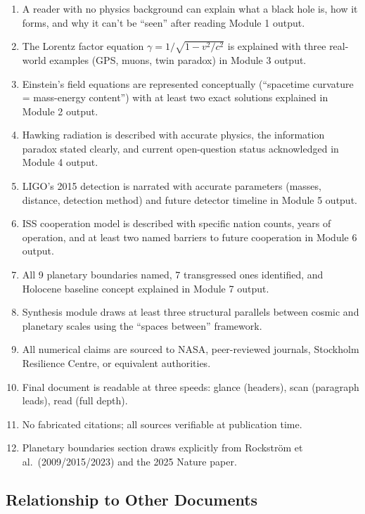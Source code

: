 \documentclass[11pt,letterpaper]{article}
\begin{document}
\begin{enumerate}[leftmargin=*]
\item A reader with no physics background can explain what a black hole is, how it forms, and why it can't be ``seen'' after reading Module 1 output.
\item The Lorentz factor equation $\gamma = 1/\sqrt{1-v^2/c^2}$ is explained with three real-world examples (GPS, muons, twin paradox) in Module 3 output.
\item Einstein's field equations are represented conceptually (``spacetime curvature = mass-energy content'') with at least two exact solutions explained in Module 2 output.
\item Hawking radiation is described with accurate physics, the information paradox stated clearly, and current open-question status acknowledged in Module 4 output.
\item LIGO's 2015 detection is narrated with accurate parameters (masses, distance, detection method) and future detector timeline in Module 5 output.
\item ISS cooperation model is described with specific nation counts, years of operation, and at least two named barriers to future cooperation in Module 6 output.
\item All 9 planetary boundaries named, 7 transgressed ones identified, and Holocene baseline concept explained in Module 7 output.
\item Synthesis module draws at least three structural parallels between cosmic and planetary scales using the ``spaces between'' framework.
\item All numerical claims are sourced to NASA, peer-reviewed journals, Stockholm Resilience Centre, or equivalent authorities.
\item Final document is readable at three speeds: glance (headers), scan (paragraph leads), read (full depth).
\item No fabricated citations; all sources verifiable at publication time.
\item Planetary boundaries section draws explicitly from Rockstr{\"o}m et al.\ (2009/2015/2023) and the 2025 Nature paper.
\end{enumerate}

\subsection{Relationship to Other Documents}
\end{document}
